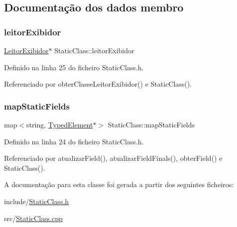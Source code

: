 \subsection{Documentação dos dados membro}
\mbox{\label{classStaticClass_a3ed320a651b791f4b9bd2c4bd4b81369}} 
\subsubsection{\texorpdfstring{leitor\+Exibidor}{leitorExibidor}}
{\footnotesize\ttfamily \hyperlink{classLeitorExibidor}{Leitor\+Exibidor}$\ast$ Static\+Class\+::leitor\+Exibidor\hspace{0.3cm}{\ttfamily [private]}}



Definido na linha 25 do ficheiro Static\+Class.\+h.



Referenciado por obter\+Classe\+Leitor\+Exibidor() e Static\+Class().

\mbox{\label{classStaticClass_a06b8f600ddea87eecdce9eef07af9a14}} 
\subsubsection{\texorpdfstring{map\+Static\+Fields}{mapStaticFields}}
{\footnotesize\ttfamily map$<$string, \hyperlink{BasicTypes_8h_a97b332303b1262282599e6ede0637b82}{Typed\+Element}$\ast$$>$ Static\+Class\+::map\+Static\+Fields\hspace{0.3cm}{\ttfamily [private]}}



Definido na linha 24 do ficheiro Static\+Class.\+h.



Referenciado por atualizar\+Field(), atualizar\+Field\+Finals(), obter\+Field() e Static\+Class().



A documentação para esta classe foi gerada a partir dos seguintes ficheiros\+:\begin{DoxyCompactItemize}
\item 
include/\hyperlink{StaticClass_8h}{Static\+Class.\+h}\item 
src/\hyperlink{StaticClass_8cpp}{Static\+Class.\+cpp}\end{DoxyCompactItemize}
